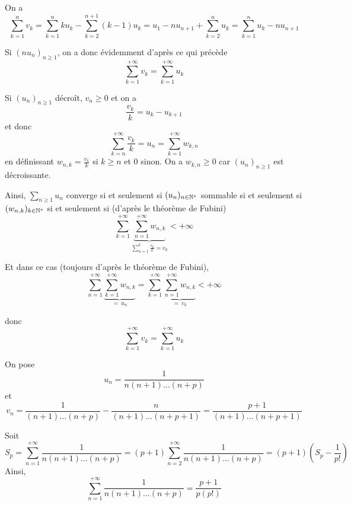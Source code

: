 \begin{solution}
	On a 
	$$\sum_{k=1}^{n}v_{k}=\sum_{k=1}^{n}ku_{k}-\sum_{k=2}^{n+1}(k-1)u_{k}=u_{1}-nu_{n+1}+\sum_{k=2}^{n}u_{k}=\sum_{k=1}^{n}u_{k}-nu_{n+1}$$

	Si $(nu_{n})_{n\geqslant1}$, on a donc évidemment d'après ce qui précède
	$$\boxed{\sum_{k=1}^{+\infty}v_{k}=\sum_{k=1}^{+\infty}u_{k}}$$

	Si $(u_{n})_{n\geqslant1}$ décroît, $v_{n}\geqslant0$ et on a 
	$$\frac{v_{k}}{k}=u_{k}-u_{k+1}$$
	et donc 
	$$\sum_{k=n}^{+\infty}\frac{v_{k}}{k}=u_{n}=\sum_{k=1}^{+\infty}w_{k,n}$$
	en définissant $w_{n,k}=\frac{v_{k}}{k}$ si $k\geqslant n$ et 0 sinon. On a $w_{k,n}\geqslant0$ car $(u_{n})_{n\geqslant1}$ est décroissante.

	Ainsi, $\sum_{n\geqslant1}u_{n}$ converge si et seulement si $(u_{n})_{n\in\mathbb{N}^{*}}$ sommable si et seulement si $(w_{n,k})_{k\in\mathbb{N}^{*}}$ si et seulement si (d'après le théorème de Fubini) 
	$$\sum_{k=1}^{+\infty}\underbrace{\sum_{n=1}^{+\infty}w_{n,k}}_{\sum_{n=1}^{k}\frac{v_{k}}{k}=v_{k}}<+\infty$$

	Et dans ce cas (toujours d'après le théorème de Fubini), 
	$$\sum_{n=1}^{+\infty}\underbrace{\sum_{k=1}^{+\infty}w_{n,k}}_{=~u_{n}}=\sum_{k=1}^{+\infty}\underbrace{\sum_{n=1}^{+\infty}w_{n,k}}_{=~v_{k}}<+\infty$$

	donc 
	$$\boxed{\sum_{k=1}^{+\infty}v_{k}=\sum_{k=1}^{+\infty}u_{k}}$$

	On pose
	$$u_{n}=\frac{1}{n(n+1)\dots(n+p)}$$
	et 
	$$v_{n}=\frac{1}{(n+1)\dots(n+p)}-\frac{n}{(n+1)\dots(n+p+1)}=\frac{p+1}{(n+1)\dots(n+p+1)}$$

	Soit 
	$$S_{p}=\sum_{n=1}^{+\infty}\frac{1}{n(n+1)\dots(n+p)}=(p+1)\sum_{n=2}^{+\infty}\frac{1}{n(n+1)\dots(n+p)}=(p+1)\left(S_{p}-\frac{1}{p!}\right)$$
	Ainsi, 
	$$\boxed{\sum_{n=1}^{+\infty}\frac{1}{n(n+1)\dots(n+p)}}=\frac{p+1}{p(p!)}$$
\end{solution}

